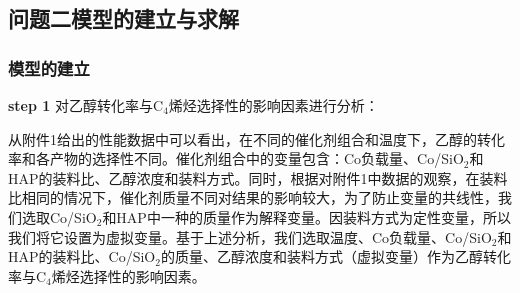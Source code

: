 \documentclass[a4paper,10.5pt]{ctexart}
\begin{document}
\subsection{问题二模型的建立与求解}

\subsubsection{模型的建立}
\par \textbf{step 1} 对乙醇转化率与C$_4$烯烃选择性的影响因素进行分析：
\par 从附件1给出的性能数据中可以看出，在不同的催化剂组合和温度下，乙醇的转化率和各产物的选择性不同。催化剂组合中的变量包含：Co负载量、Co/SiO$_2$和HAP的装料比、乙醇浓度和装料方式。同时，根据对附件1中数据的观察，在装料比相同的情况下，催化剂质量不同对结果的影响较大，为了防止变量的共线性，我们选取Co/SiO$_2$和HAP中一种的质量作为解释变量。因装料方式为定性变量，所以我们将它设置为虚拟变量。基于上述分析，我们选取温度、Co负载量、Co/SiO$_2$和HAP的装料比、Co/SiO$_2$的质量、乙醇浓度和装料方式（虚拟变量）作为乙醇转化率与C$_4$烯烃选择性的影响因素。
\end{document}
